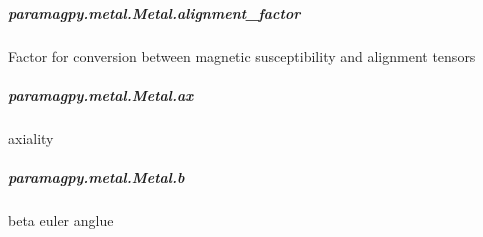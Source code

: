 \documentclass[a4paper,10pt,english,openany,oneside]{sphinxmanual}
\begin{document}
\begin{fulllineitems}
\begin{fulllineitems}
\begin{fulllineitems}
\end{fulllineitems}



\subparagraph{paramagpy.metal.Metal.alignment\_factor}
\label{\detokenize{reference/generated/paramagpy.metal.Metal.alignment_factor:paramagpy-metal-metal-alignment-factor}}\label{\detokenize{reference/generated/paramagpy.metal.Metal.alignment_factor::doc}}

\begin{fulllineitems}
\label{\detokenize{reference/generated/paramagpy.metal.Metal.alignment_factor:paramagpy.metal.Metal.alignment_factor}}
\sphinxAtStartPar
Factor for conversion between magnetic susceptibility
and alignment tensors

\end{fulllineitems}



\subparagraph{paramagpy.metal.Metal.ax}
\label{\detokenize{reference/generated/paramagpy.metal.Metal.ax:paramagpy-metal-metal-ax}}\label{\detokenize{reference/generated/paramagpy.metal.Metal.ax::doc}}

\begin{fulllineitems}
\label{\detokenize{reference/generated/paramagpy.metal.Metal.ax:paramagpy.metal.Metal.ax}}
\sphinxAtStartPar
axiality

\end{fulllineitems}



\subparagraph{paramagpy.metal.Metal.b}
\label{\detokenize{reference/generated/paramagpy.metal.Metal.b:paramagpy-metal-metal-b}}\label{\detokenize{reference/generated/paramagpy.metal.Metal.b::doc}}

\begin{fulllineitems}
\label{\detokenize{reference/generated/paramagpy.metal.Metal.b:paramagpy.metal.Metal.b}}
\sphinxAtStartPar
beta euler anglue


\end{fulllineitems}
\end{fulllineitems}
\end{fulllineitems}
\end{document}
